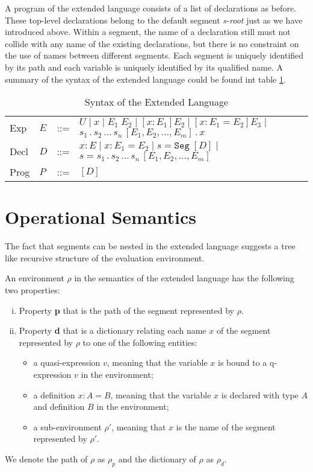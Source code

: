 A program of the extended language consists of a list of declarations as before. These top-level declarations belong to the default segment \emph{s-root} just as we have introduced above. Within a segment, the name of a declaration still must not collide with any name of the existing declarations, but there is no constraint on the use of names between different segments. Each segment is uniquely identified by its path and each variable is uniquely identified by its qualified name. A summary of the syntax of the extended language could be found int table \ref{extension:tab:syntax}.
\begin{table}[h]
  \centering
  \begin{tabular}{l l l p{8cm}}
    Exp  & $E$ & ::= & $U \mid x \mid E_1 \; E_2 \mid [x : E_1] E_2 \mid [x : E_1 = E_2] E_3 \mid $ \newline $s_1\,.\,s_2\,\dots\,s_n\,[E_1,E_2,\dots,E_m]\,.\,x$ \\
    Decl & $D$ & ::= & $x : E \mid x : E_1 = E_2 \mid s = \texttt{Seg}\;[D] \mid$ \newline $s = s_1\,.\,s_2\,\dots\,s_n\,[E_1,E_2,\dots,E_m]$ \\
    Prog & $P$ & ::= & $[D]$
  \end{tabular}
  \caption{Syntax of the Extended Language}
  \label{extension:tab:syntax}
\end{table}

\section{Operational Semantics}
The fact that segments can be nested in the extended language suggests a tree like recursive structure of the evaluation environment.
\begin{definition}[Environment]
  An environment $\rho$ in the semantics of the extended language has the following two properties:
  \begin{enumerate}[(i)]
  \item Property \textbf{p} that is the path of the segment represented by $\rho$.
  \item Property \textbf{d} that is a dictionary relating each name $x$ of the segment represented by $\rho$ to one of the following entities:
    \begin{itemize}
    \item a quasi-expression $v$, meaning that the variable $x$ is bound to a q-expression $v$ in the environment;
    \item a definition $x : A = B$, meaning that the variable $x$ is declared with type $A$ and definition $B$ in the environment;
    \item a sub-environment $\rho'$, meaning that $x$ is the name of the segment represented by $\rho'$.
    \end{itemize}
  \end{enumerate}
  We denote the path of $\rho$ as $\rho_{p}$ and the dictionary of $\rho$ as $\rho_{d}$.
\end{definition}


